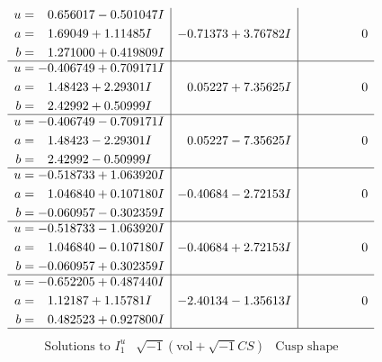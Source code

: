 \documentclass[1p]{elsarticle_modified}
\theoremstyle{definition}
\newcommand{\I}{\sqrt{-1}}
\begin{document}
$$\begin{array}{c|c|c}
\begin{aligned}
u &= \phantom{-}0.656017 - 0.501047 I \\
a &= \phantom{-}1.69049 + 1.11485 I \\
b &= \phantom{-}1.271000 + 0.419809 I\end{aligned}
 & -0.71373 + 3.76782 I & \phantom{-0.000000 } 0 \\ \hline\begin{aligned}
u &= -0.406749 + 0.709171 I \\
a &= \phantom{-}1.48423 + 2.29301 I \\
b &= \phantom{-}2.42992 + 0.50999 I\end{aligned}
 & \phantom{-}0.05227 + 7.35625 I & \phantom{-0.000000 } 0 \\ \hline\begin{aligned}
u &= -0.406749 - 0.709171 I \\
a &= \phantom{-}1.48423 - 2.29301 I \\
b &= \phantom{-}2.42992 - 0.50999 I\end{aligned}
 & \phantom{-}0.05227 - 7.35625 I & \phantom{-0.000000 } 0 \\ \hline\begin{aligned}
u &= -0.518733 + 1.063920 I \\
a &= \phantom{-}1.046840 + 0.107180 I \\
b &= -0.060957 - 0.302359 I\end{aligned}
 & -0.40684 - 2.72153 I & \phantom{-0.000000 } 0 \\ \hline\begin{aligned}
u &= -0.518733 - 1.063920 I \\
a &= \phantom{-}1.046840 - 0.107180 I \\
b &= -0.060957 + 0.302359 I\end{aligned}
 & -0.40684 + 2.72153 I & \phantom{-0.000000 } 0 \\ \hline\begin{aligned}
u &= -0.652205 + 0.487440 I \\
a &= \phantom{-}1.12187 + 1.15781 I \\
b &= \phantom{-}0.482523 + 0.927800 I\end{aligned}
 & -2.40134 - 1.35613 I & \phantom{-0.000000 } 0\\
 \hline 
 \end{array}$$\newpage$$\begin{array}{c|c|c}  
\text{Solutions to }I^u_{1}& \I (\text{vol} + \sqrt{-1}CS) & \text{Cusp shape}\\
 \hline 
\begin{aligned}

\end{aligned}
\end{array}$$
\end{document}
